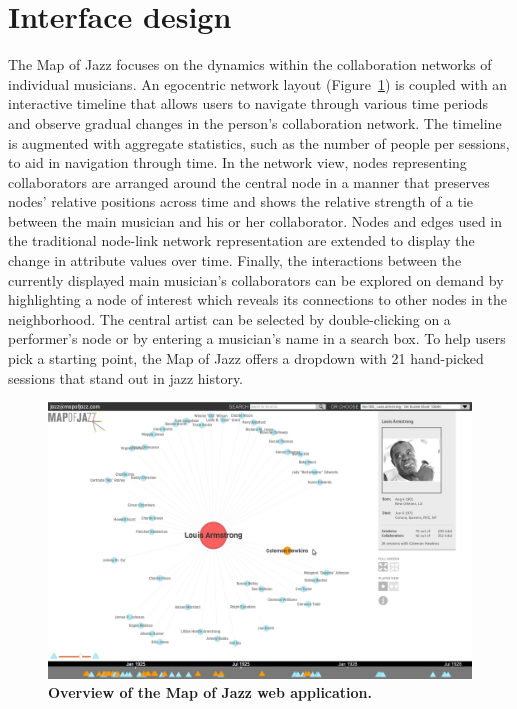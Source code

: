 \documentclass[12pt]{cmuthesis}
\begin{document}
\section{Interface design}


  The Map of Jazz focuses on the dynamics within the collaboration networks of individual musicians. An egocentric network layout (Figure~\ref{fig:moj:overview}) is coupled with an interactive timeline that allows users to navigate through various time periods and observe gradual changes in the person's collaboration network. The timeline is augmented with aggregate statistics, such as the number of people per sessions, to aid in navigation through time. In the network view, nodes representing collaborators are arranged around the central node in a manner that preserves nodes' relative positions across time and shows the relative strength of a tie between the main musician and his or her collaborator. Nodes and edges used in the traditional node-link network representation are extended to display the change in attribute values over time. Finally, the interactions between the currently displayed main musician's collaborators can be explored on demand by highlighting a node of interest which reveals its connections to other nodes in the neighborhood. The central artist can be selected by double-clicking on a performer's node or by entering a musician's name in a search box. To help users pick a starting point, the Map of Jazz offers a dropdown with 21 hand-picked sessions that stand out in jazz history.


  \begin{figure}[tb!]
    \centering
    \includegraphics[width=\linewidth]{figures/moj_overview.png}
    \caption{\textbf{Overview of the Map of Jazz web application.}}
    \label{fig:moj:overview}
  \end{figure}
\end{document}
